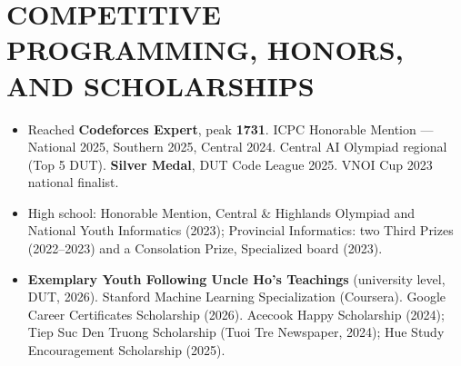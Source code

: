 \documentclass[10pt,a4paper]{article}
\begin{document}
\section{COMPETITIVE PROGRAMMING, HONORS, AND SCHOLARSHIPS}
\begin{itemize}
  \item \small Reached \textbf{Codeforces Expert}, peak \textbf{1731}. ICPC Honorable Mention --- National 2025, Southern 2025, Central 2024. Central AI Olympiad regional (Top 5 DUT). \textbf{Silver Medal}, DUT Code League 2025. VNOI Cup 2023 national finalist.
  \item \small High school: Honorable Mention, Central \& Highlands Olympiad and National Youth Informatics (2023); Provincial Informatics: two Third Prizes (2022--2023) and a Consolation Prize, Specialized board (2023).
  \item \small \textbf{Exemplary Youth Following Uncle Ho's Teachings} (university level, DUT, 2026). Stanford Machine Learning Specialization (Coursera). Google Career Certificates Scholarship (2026). Acecook Happy Scholarship (2024); Tiep Suc Den Truong Scholarship (Tuoi Tre Newspaper, 2024); Hue Study Encouragement Scholarship (2025).
\end{itemize}
\end{document}

